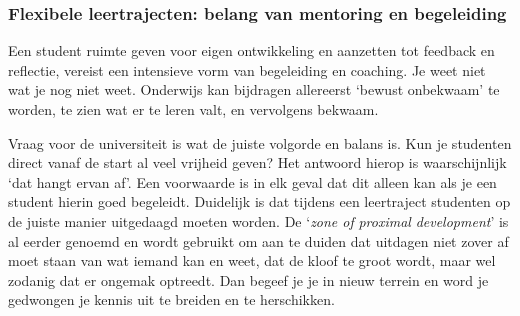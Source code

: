 \documentclass[smallauthor, chapterhaspagenum, nochapterinheader, pagenuminheader,  bigchapnum,medium2, tocpages, garamond, titleinheader]{jote-book}
\begin{document}
	\subsubsection{Flexibele leertrajecten: belang van mentoring en begeleiding}



	Een student ruimte geven voor eigen ontwikkeling en aanzetten tot feedback en reflectie, vereist een intensieve vorm van begeleiding en coaching. Je weet niet wat je nog niet weet. Onderwijs kan bijdragen allereerst ‘bewust onbekwaam' te worden, te zien wat er te leren valt, en vervolgens bekwaam.



	Vraag voor de universiteit is wat de juiste volgorde en balans is. Kun je studenten direct vanaf de start al veel vrijheid geven? Het antwoord hierop is waarschijnlijk ‘dat hangt ervan af'. Een voorwaarde is in elk geval dat dit alleen kan als je een student hierin goed begeleidt. Duidelijk is dat tijdens een leertraject studenten op de juiste manier uitgedaagd moeten worden. De ‘\emph{zone of }\emph{proximal}\emph{ development}' is al eerder genoemd en wordt gebruikt om aan te duiden dat uitdagen niet zover af moet staan van wat iemand kan en weet, dat de kloof te groot wordt, maar wel zodanig dat er ongemak optreedt. Dan begeef je je in nieuw terrein en word je gedwongen je kennis uit te breiden en te herschikken.
\end{document}
